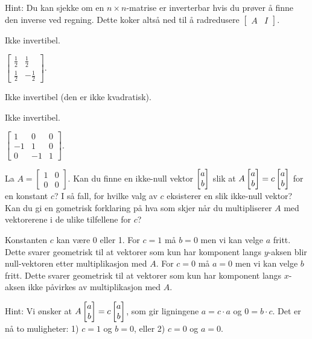 \begin{losning}
Hint: Du kan sjekke om en $n\times n$-matrise er inverterbar hvis du prøver å finne den inverse ved regning. Dette koker altså ned til å radredusere $\begin{bmatrix}A & I \end{bmatrix}$.

\begin{punkt}
Ikke invertibel.
\end{punkt}

\begin{punkt}
$\begin{bmatrix}
\frac{1}{2} & \frac{1}{2}\\
\frac{1}{2} & -\frac{1}{2}
\end{bmatrix}.$
\end{punkt}

\begin{punkt}
Ikke invertibel (den er ikke kvadratisk).
\end{punkt}


\begin{punkt}
Ikke invertibel.
\end{punkt}


\begin{punkt}
$\begin{bmatrix}
1 & 0 & 0 \\
-1 & 1 & 0 \\
0 & -1 & 1
\end{bmatrix}.$
\end{punkt}


\end{losning}


\begin{oppgave}

La $A=\begin{bmatrix}
1 & 0\\
0 & 0
\end{bmatrix}$. Kan du finne en ikke-null vektor $\begin{bmatrix} a \\ b \end{bmatrix}$ slik at $A\begin{bmatrix} a \\ b \end{bmatrix}=c\begin{bmatrix} a \\ b \end{bmatrix}$ for en konstant $c$? I så fall, for hvilke valg av $c$ eksisterer en slik ikke-null vektor? Kan du gi en gometrisk forklaring på hva som skjer når du multipliserer $A$ med vektorerene i de ulike tilfellene for $c$?
\end{oppgave}



\begin{losning}

Konstanten $c$ kan være 0 eller 1. For $c=1$ må $b=0$ men vi kan velge $a$ fritt. Dette svarer geometrisk til at vektorer som kun har komponent langs $y$-aksen blir null-vektoren etter multiplikasjon med $A$. For $c=0$ må $a=0$ men vi kan velge $b$ fritt. Dette svarer geometrisk til at vektorer som kun har komponent langs $x$-aksen ikke påvirkes av multiplikasjon med $A$.


Hint: Vi ønsker at $A\begin{bmatrix} a \\ b \end{bmatrix}=c\begin{bmatrix} a \\ b \end{bmatrix}$, som gir ligningene $a=c\cdot a$ og $0=b\cdot c$. Det er nå to muligheter: 1) $c=1$ og $b=0$, eller 2) $c=0$ og $a=0$.



\end{losning}




